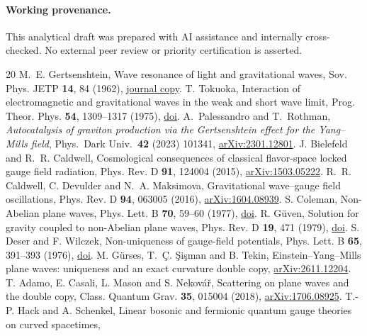 \documentclass[11pt]{article}
\begin{document}
\paragraph{Working provenance.} This analytical draft was prepared with AI assistance and internally cross-checked. No external peer review or priority certification is asserted.

\begin{thebibliography}{20}
 M.~E. Gertsenshtein,
Wave resonance of light and gravitational waves,
Sov. Phys. JETP \textbf{14}, 84 (1962),
\href{https://jetp.ras.ru/cgi-bin/dn/e_014_01_0084.pdf}{journal copy}.
 T. Tokuoka,
Interaction of electromagnetic and gravitational waves in the weak and short wave limit,
Prog. Theor. Phys. \textbf{54}, 1309--1317 (1975),
\href{https://doi.org/10.1143/PTP.54.1309}{doi}.
 A.~Palessandro and T.~Rothman, \emph{Autocatalysis of graviton production via the Gertsenshtein effect for the Yang--Mills field}, Phys.\ Dark Univ.\ \textbf{42} (2023) 101341, \href{https://arxiv.org/abs/2301.12801}{arXiv:2301.12801}.
 J. Bielefeld and R.~R. Caldwell,
Cosmological consequences of classical flavor-space locked gauge field radiation,
Phys. Rev. D \textbf{91}, 124004 (2015),
\href{https://arxiv.org/abs/1503.05222}{arXiv:1503.05222}.
 R.~R. Caldwell, C. Devulder and N.~A. Maksimova,
Gravitational wave--gauge field oscillations,
Phys. Rev. D \textbf{94}, 063005 (2016),
\href{https://arxiv.org/abs/1604.08939}{arXiv:1604.08939}.
 S. Coleman, Non-Abelian plane waves,
Phys. Lett. B \textbf{70}, 59--60 (1977),
\href{https://doi.org/10.1016/0370-2693(77)90344-6}{doi}.
 R. G\"uven, Solution for gravity coupled to non-Abelian plane waves,
Phys. Rev. D \textbf{19}, 471 (1979),
\href{https://doi.org/10.1103/PhysRevD.19.471}{doi}.
 S. Deser and F. Wilczek, Non-uniqueness of gauge-field potentials,
Phys. Lett. B \textbf{65}, 391--393 (1976),
\href{https://doi.org/10.1016/0370-2693(76)90250-1}{doi}.
 M. G\"urses, T.~\c{C}. \c{S}i\c{s}man and B. Tekin,
Einstein--Yang--Mills plane waves: uniqueness and an exact curvature double copy,
\href{https://arxiv.org/abs/2611.12204}{arXiv:2611.12204}.
 T. Adamo, E. Casali, L. Mason and S. Nekov\'a\v{r},
Scattering on plane waves and the double copy,
Class. Quantum Grav. \textbf{35}, 015004 (2018),
\href{https://arxiv.org/abs/1706.08925}{arXiv:1706.08925}.
 T.-P. Hack and A. Schenkel,
Linear bosonic and fermionic quantum gauge theories on curved spacetimes,

\end{thebibliography}
\end{document}
